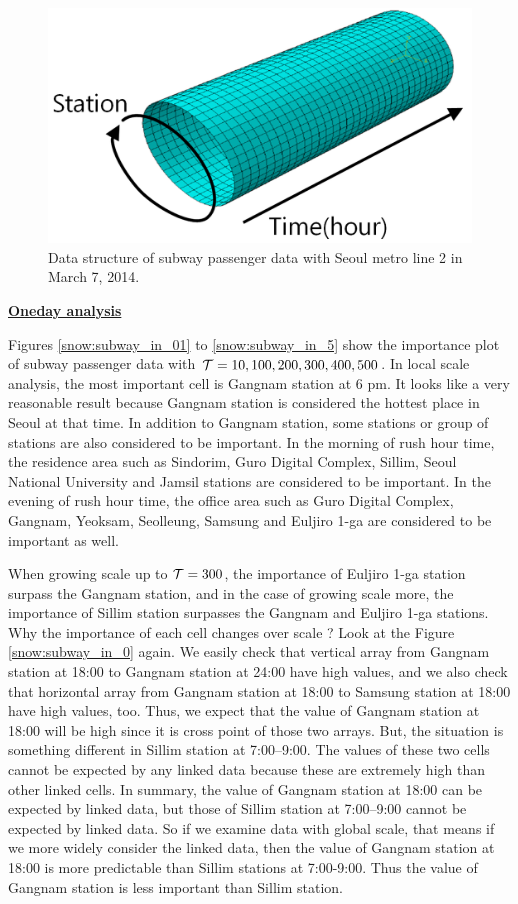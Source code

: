 \documentclass[preprint, review, 12pt]{article}
\theoremstyle{definition}
\theoremstyle{remark}
\begin{document}
\begin{figure}
\centering
\includegraphics[width=1\textwidth]{Fig/data_str.png}
\vspace{-13mm}
\caption{Data structure of subway passenger data with Seoul metro line 2 in March 7, 2014.} 
\label{snow:datasrt}
\end{figure}

\noindent\textbf{\underline{Oneday analysis}}

Figures \ref{snow:subway_in_01} to \ref{snow:subway_in_5} show the importance plot of subway passenger data with ${\cal T}=10,100,200,300,400,500$. In local scale analysis, the most important cell is Gangnam station at 6 pm. It looks like a very reasonable result because Gangnam station is considered the hottest place in Seoul at that time. In addition to Gangnam station, some stations or group of stations are also considered to be important. In the morning of rush hour time, the residence area such as Sindorim, Guro Digital Complex, Sillim, Seoul National University and Jamsil stations are considered to be important. In the evening of rush hour time, the office area such as Guro Digital Complex, Gangnam, Yeoksam, Seolleung, Samsung and Euljiro 1-ga are considered to be important as well. 

When growing scale up to ${\cal T}=300$, the importance of Euljiro 1-ga station surpass the Gangnam station, and in the case of  growing scale more, the importance of Sillim station surpasses the Gangnam and Euljiro 1-ga stations. Why the importance of each cell changes over scale ? Look at the Figure \ref{snow:subway_in_0} again. We easily check that vertical array from Gangnam station at 18:00 to Gangnam station at 24:00 have high values, and we also check that horizontal array from Gangnam station at 18:00 to Samsung station at 18:00 have high values, too. Thus, we expect that the value of Gangnam station at 18:00 will be high since it is cross point of those two arrays. But, the situation is something different in Sillim station at 7:00--9:00. The values of these two cells cannot be expected by any linked data because these are extremely high than other linked cells. In summary, the value of Gangnam station at 18:00 can be expected by linked data, but those of Sillim station at 7:00--9:00 cannot be expected by linked data. So if we examine data with global scale, that means if we more widely consider the linked data, then the value of Gangnam station at 18:00 is more predictable than Sillim stations at 7:00-9:00. Thus the value of Gangnam station is less important than Sillim station.
\end{document}
